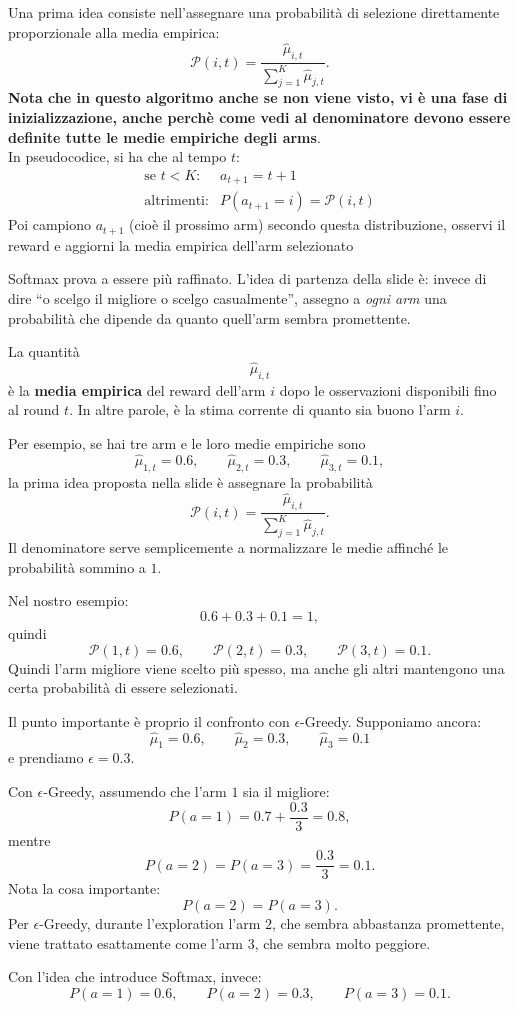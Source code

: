 Una prima idea consiste nell'assegnare una probabilità di selezione direttamente proporzionale alla media empirica:
\[
\mathcal{P}(i,t)
=
\frac{
\widehat{\mu}_{i,t}
}{
\sum_{j=1}^{K}\widehat{\mu}_{j,t}
}.
\]
\textbf{Nota che in questo algoritmo anche se non viene visto, vi è una fase di inizializzazione, anche perchè come vedi al denominatore devono essere definite tutte le medie empiriche degli arms}.
\\
In pseudocodice, si ha che al tempo $t$:
\[
\boxed{
\begin{array}{ll}
\text{se }t<K: &
a_{t+1}=t+1
\\[1ex]
\text{altrimenti:} &
P(a_{t+1}=i)
=\mathcal{P}(i,t)
\end{array}}
\]
Poi campiono \(a_{t+1}\) (cioè il prossimo arm) secondo questa distribuzione, osservi il reward e aggiorni la media empirica dell'arm selezionato
\begin{observation}{}
    Softmax prova a essere più raffinato. L'idea di partenza della slide è: invece di dire ``o scelgo il migliore o scelgo casualmente'', assegno a \emph{ogni arm} una probabilità che dipende da quanto quell'arm sembra promettente.

La quantità
\[
\widehat{\mu}_{i,t}
\]
è la \textbf{media empirica} del reward dell'arm \(i\) dopo le osservazioni disponibili fino al round \(t\). In altre parole, è la stima corrente di quanto sia buono l'arm \(i\).

Per esempio, se hai tre arm e le loro medie empiriche sono
\[
\widehat{\mu}_{1,t}=0.6,\qquad
\widehat{\mu}_{2,t}=0.3,\qquad
\widehat{\mu}_{3,t}=0.1,
\]
la prima idea proposta nella slide è assegnare la probabilità
\[
\mathcal{P}(i,t)
=
\frac{\widehat{\mu}_{i,t}}
{\sum_{j=1}^{K}\widehat{\mu}_{j,t}}.
\]
Il denominatore serve semplicemente a normalizzare le medie affinché le probabilità sommino a \(1\).

Nel nostro esempio:
\[
0.6+0.3+0.1=1,
\]
quindi
\[
\mathcal{P}(1,t)=0.6,\qquad
\mathcal{P}(2,t)=0.3,\qquad
\mathcal{P}(3,t)=0.1.
\]
Quindi l'arm migliore viene scelto più spesso, ma anche gli altri mantengono una certa probabilità di essere selezionati.

Il punto importante è proprio il confronto con \(\epsilon\)-Greedy. Supponiamo ancora:
\[
\widehat{\mu}_1=0.6,\qquad
\widehat{\mu}_2=0.3,\qquad
\widehat{\mu}_3=0.1
\]
e prendiamo \(\epsilon=0.3\).

Con \(\epsilon\)-Greedy, assumendo che l'arm \(1\) sia il migliore:
\[
P(a=1)
=
0.7+\frac{0.3}{3}
=
0.8,
\]
mentre
\[
P(a=2)=P(a=3)=\frac{0.3}{3}=0.1.
\]
Nota la cosa importante:
\[
P(a=2)=P(a=3).
\]
Per \(\epsilon\)-Greedy, durante l'exploration l'arm \(2\), che sembra abbastanza promettente, viene trattato esattamente come l'arm \(3\), che sembra molto peggiore.

Con l'idea che introduce Softmax, invece:
\[
P(a=1)=0.6,\qquad
P(a=2)=0.3,\qquad
P(a=3)=0.1.
\]
\end{observation}

